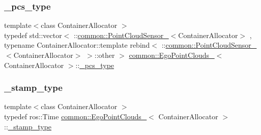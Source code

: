 \mbox{\label{structcommon_1_1EgoPointClouds___ae9a969cfa2bb2b88e7c3dad0cfe9373d}} 
\subsubsection{\texorpdfstring{\+\_\+pcs\+\_\+type}{\_pcs\_type}}
{\footnotesize\ttfamily template$<$class Container\+Allocator $>$ \\
typedef std\+::vector$<$ \+::\hyperlink{structcommon_1_1PointCloudSensor__}{common\+::\+Point\+Cloud\+Sensor\+\_\+}$<$Container\+Allocator$>$ , typename Container\+Allocator\+::template rebind$<$ \+::\hyperlink{structcommon_1_1PointCloudSensor__}{common\+::\+Point\+Cloud\+Sensor\+\_\+}$<$Container\+Allocator$>$ $>$\+::other $>$ \hyperlink{structcommon_1_1EgoPointClouds__}{common\+::\+Ego\+Point\+Clouds\+\_\+}$<$ Container\+Allocator $>$\+::\hyperlink{structcommon_1_1EgoPointClouds___ae9a969cfa2bb2b88e7c3dad0cfe9373d}{\+\_\+pcs\+\_\+type}}

\mbox{\label{structcommon_1_1EgoPointClouds___a45a194b26ca8e4132a7d5e02e659d68f}} 
\subsubsection{\texorpdfstring{\+\_\+stamp\+\_\+type}{\_stamp\_type}}
{\footnotesize\ttfamily template$<$class Container\+Allocator $>$ \\
typedef ros\+::\+Time \hyperlink{structcommon_1_1EgoPointClouds__}{common\+::\+Ego\+Point\+Clouds\+\_\+}$<$ Container\+Allocator $>$\+::\hyperlink{structcommon_1_1EgoPointClouds___a45a194b26ca8e4132a7d5e02e659d68f}{\+\_\+stamp\+\_\+type}}

\mbox{\label{structcommon_1_1EgoPointClouds___a92f4c266292be35a268030b544d34d6d}} 
